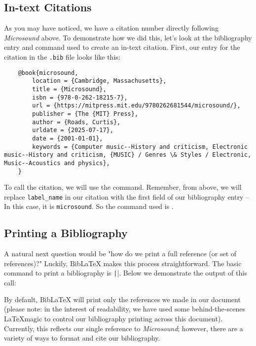 \documentclass{article}
\begin{document}
\subsection{In-text Citations}

As you may have noticed, we have a citation number directly following \textit{Microsound} above. To demonstrate how we did this, let's look at the bibliography entry and command used to create an in-text citation. First, our entry for the citation in the \texttt{.bib} file looks like this:
    \begin{verbatim}
    @book{microsound,
    	location = {Cambridge, Massachusetts},
    	title = {Microsound},
    	isbn = {978-0-262-18215-7},
    	url = {https://mitpress.mit.edu/9780262681544/microsound/},
    	publisher = {The {MIT} Press},
    	author = {Roads, Curtis},
    	urldate = {2025-07-17},
    	date = {2001-01-01},
    	keywords = {Computer music--History and criticism, Electronic music--History and criticism, {MUSIC} / Genres \& Styles / Electronic, Music--Acoustics and physics},
    }
    \end{verbatim}

To call the citation, we will use the \texttt{\cite{label_name}} command. Remember, from above, we will replace \texttt{label\_name} in our citation with the first field of our bibliography entry -- In this case, it is \texttt{microsound}. So the command used is \texttt{\cite{microsound}}.

\subsection{Printing a Bibliography}
A natural next question would be "how do we print a full reference (or set of references)?" Luckily, BibLaTeX makes this process straightforward. The basic command to print a bibliography is \texttt|\printbibliography|. Below we demonstrate the output of this call:

\printbibliography[segment=1]

\newrefsegment
By default, BibLaTeX will print only the references we made in our document (please note: in the interest of readability, we have used some behind-the-scenes \LaTeX \space magic to control our bibliography printing across this document). Currently, this reflects our single reference to \textit{Microsound}; however, there are a variety of ways to format and cite our bibliography.
\end{document}
